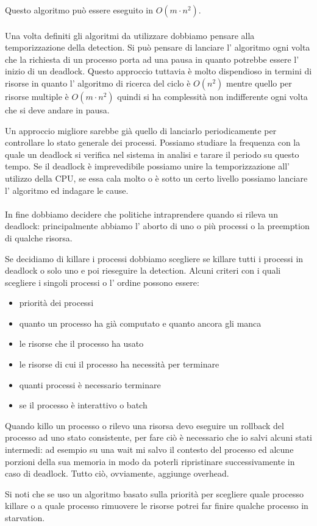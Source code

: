 Questo algoritmo può essere eseguito in $O(m \cdot n^2)$.
\\
\\
Una volta definiti gli algoritmi da utilizzare dobbiamo pensare alla temporizzazione della detection.
Si può pensare di lanciare l' algoritmo ogni volta che la richiesta di un processo porta ad una pausa in quanto potrebbe essere l' inizio di un deadlock.
Questo approccio tuttavia è molto dispendioso in termini di risorse in quanto l' algoritmo di ricerca del ciclo è $O(n^2)$ mentre quello per risorse multiple è $O(m \cdot n^2)$ quindi si ha complessità non indifferente ogni volta che si deve andare in pausa.

Un approccio migliore sarebbe già quello di lanciarlo periodicamente per controllare lo stato generale dei processi.
Possiamo studiare la frequenza con la quale un deadlock si verifica nel sistema in analisi e tarare il periodo su questo tempo.
Se il deadlock è imprevedibile possiamo unire la temporizzazione all' utilizzo della CPU, se essa cala molto o è sotto un certo livello possiamo lanciare l' algoritmo ed indagare le cause.
\\
\\
In fine dobbiamo decidere che politiche intraprendere quando si rileva un deadlock: principalmente abbiamo l' aborto di uno o più processi o la preemption di qualche risorsa.

Se decidiamo di killare i processi dobbiamo scegliere se killare tutti i processi in deadlock o solo uno e poi rieseguire la detection.
Alcuni criteri con i quali scegliere i singoli processi o l' ordine possono essere:
\begin{itemize}
    \item priorità dei processi
    \item quanto un processo ha già computato e quanto ancora gli manca
    \item le risorse che il processo ha usato
    \item le risorse di cui il processo ha necessità per terminare
    \item quanti processi è necessario terminare
    \item se il processo è interattivo o batch
\end{itemize}

Quando killo un processo o rilevo una risorsa devo eseguire un rollback del processo ad uno stato consistente, per fare ciò è necessario che io salvi alcuni stati intermedi: ad esempio su una wait mi salvo il contesto del processo ed alcune porzioni della sua memoria in modo da poterli ripristinare successivamente in caso di deadlock.
Tutto ciò, ovviamente, aggiunge overhead.

Si noti che se uso un algoritmo basato sulla priorità per scegliere quale processo killare o a quale processo rimuovere le risorse potrei far finire qualche processo in starvation.
